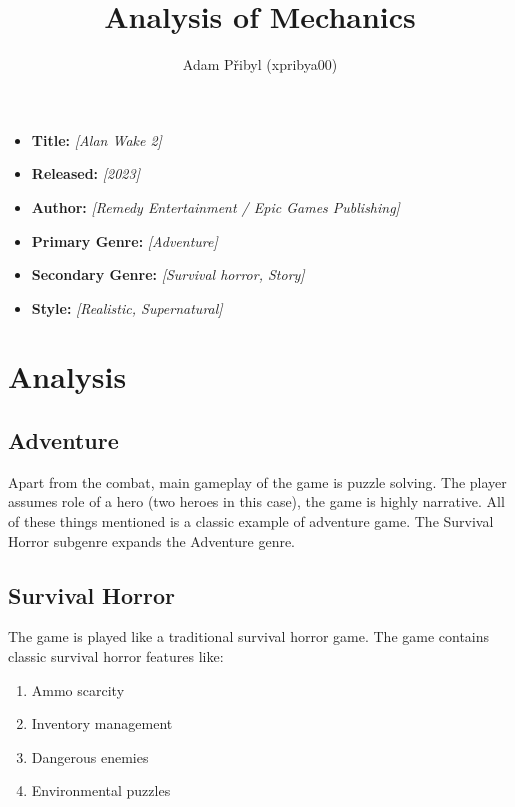 \documentclass[a4paper,10pt,english]{article}
\title{%
Analysis of Mechanics%
}
\author{%
Adam Přibyl (xpribya00)%
}
\date{}
\newcommand{\ph}[1]{\textit{[#1]}}
\begin{document}
\maketitle
\thispagestyle{empty}

{%
\large

\begin{itemize}

\item[] \textbf{Title:} \ph{Alan Wake 2}

\item[] \textbf{Released:} \ph{2023}

\item[] \textbf{Author:} \ph{Remedy Entertainment / Epic Games Publishing}

\item[] \textbf{Primary Genre:} \ph{Adventure}

\item[] \textbf{Secondary Genre:} \ph{Survival horror, Story}

\item[] \textbf{Style:} \ph{Realistic, Supernatural}

\end{itemize}

}

\section*{\centering Analysis}

\subsection*{Adventure}
Apart from the combat, main gameplay of the game is puzzle solving. The player assumes role of a hero (two heroes in this case), the game is highly narrative. All of these things mentioned is a classic example of adventure game. The Survival Horror subgenre expands the Adventure genre.

\subsection*{Survival Horror}
The game is played like a traditional survival horror game. The game contains classic survival horror features like: 
\begin{enumerate}
\item Ammo scarcity
\item Inventory management
\item Dangerous enemies
\item Environmental puzzles
\end{enumerate}
\end{document}
